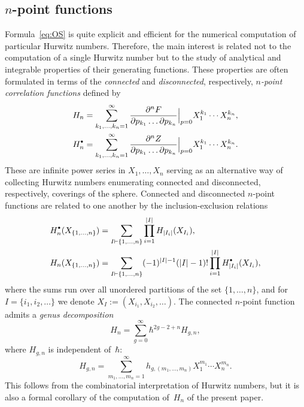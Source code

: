 \documentclass[JEP,XML,SOM,Unicode,NoEqCountersInSection,NoFloatCountersInSection]{cedram}
\newcommand{\sbullet}{{\scriptscriptstyle\bullet}}
\newcommand{\csbullet}{{\raisebox{1pt}{$\sbullet$}}}
\theoremstyle{plain}
\theoremstyle{definition}
\theoremstyle{remark}
\newcommand{\Hd}{H^\csbullet}
\begin{document}
\subsection{\texorpdfstring{$n$}{n}-point functions}

Formula~\eqref{eq:OS} is quite explicit and efficient for the numerical computation of particular Hurwitz numbers. Therefore, the main interest is related not to the computation of a single Hurwitz number but to the study of analytical and integrable properties of their generating functions. These properties are often formulated in terms of the \emph{connected} and \emph{disconnected}, respectively, \emph{$n$-point correlation functions} defined by\vspace*{-3pt}
\begin{align}\label{eq:Hndef}
H_n&=\sum_{k_1,\dots,k_n=1}^\infty\frac{\partial^n F}{\partial p_{k_1}\dots\partial p_{k_n}}\Big|_{p=0}X_1^{k_1}\cdots X_n^{k_n},\\ \label{eq:Hdndef}
\Hd_n&=\sum_{k_1,\dots,k_n=1}^\infty\frac{\partial^n Z}{\partial p_{k_1}\dots\partial p_{k_n}}\Big|_{p=0}X_1^{k_1}\cdots X_n^{k_n}.
\end{align}
These are infinite power series in $X_1,\dots,X_n$ serving as an alternative way of collecting Hurwitz numbers enumerating connected and disconnected, respectively, coverings of the sphere. Connected and disconnected $n$-point functions are related to one another by the inclusion-exclusion relations\vspace*{-3pt}
\begin{equation}\label{eq:inclexclH}
\begin{aligned}
\Hd_n(X_{\{1,\dots,n\}})&= \sum\limits_{I\vdash\{1,\ldots,n\}}\prod\limits_{i=1}^{|I|}H_{|I_i|}(X_{I_i}),\\
H_n(X_{\{1,\dots,n\}})&= \sum\limits_{I\vdash\{1,\ldots,n\}}(-1)^{|I|-1}(|I|-1)!\prod\limits_{i=1}^{|I|}\Hd_{|I_i|}(X_{I_i}),
\end{aligned}
\end{equation}
where the sums run over all unordered partitions of the set $\{1,\dots,n\}$, and for $I=\{i_1,i_2,\dots\}$ we denote $X_I:=(X_{i_1},X_{i_2},\dots)$. The connected $n$-point function admits a \emph{genus decomposition}
\begin{equation*}
H_n=\sum_{g=0}^\infty \hbar^{2g-2+n}H_{g,n},
\end{equation*}
where $H_{g,n}$ is independent of~$\hbar$:
\begin{equation*}
H_{g,n}=\sum_{m_1,\dots,m_n=1}^\infty h_{g,(m_1,\dots,m_n)}X_1^{m_1}\cdots X_n^{m_n}.
\end{equation*}
This follows from the combinatorial interpretation of Hurwitz numbers, but it is also a formal corollary of the computation of~$H_{n}$ of the present paper.
\end{document}
